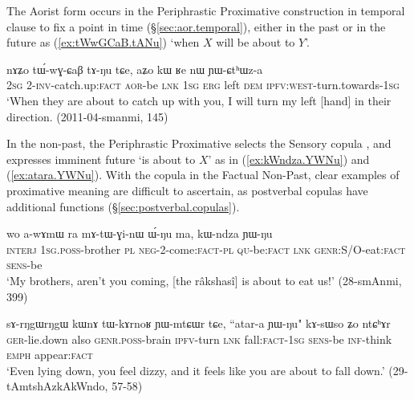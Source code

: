 The Aorist form  occurs in the Periphrastic Proximative construction in temporal clause to fix a point in time (§\ref{sec:aor.temporal}), either in the past or in the future as (\ref{ex:tWwGCaB.tANu}) `when $X$ will be about to $Y$'.

\begin{exe} 
\ex \label{ex:tWwGCaB.tANu}
\gll  nɤʑo tɯ́-wɣ-ɕaβ tɤ-ŋu tɕe, aʑo kɯ ʁe nɯ ɲɯ-ɕtʰɯz-a \\
\textsc{2sg} 2-\textsc{inv}-catch.up:\textsc{fact} \textsc{aor}-be \textsc{lnk} \textsc{1sg} \textsc{erg} left \textsc{dem} \textsc{ipfv}:\textsc{west}-turn.towards-\textsc{1sg} \\ 
\glt `When they are about to catch up with you, I will turn my left [hand] in their direction. (2011-04-smanmi, 145)
 \end{exe}
 
In the non-past, the Periphrastic Proximative selects the Sensory copula , and expresses imminent future `is about to $X$' as in (\ref{ex:kWndza.YWNu}) and (\ref{ex:atara.YWNu}). With the copula in the Factual Non-Past, clear examples of proximative meaning are difficult to ascertain, as postverbal copulas have additional functions (§\ref{sec:postverbal.copulas}).

 \begin{exe} 
\ex \label{ex:kWndza.YWNu}
\gll  wo a-wɤmɯ ra mɤ-tɯ-ɣi-nɯ ɯ́-ŋu ma, kɯ-ndza ɲɯ-ŋu \\
\textsc{interj} \textsc{1sg}.\textsc{poss}-brother \textsc{pl} \textsc{neg}-2-come:\textsc{fact}-\textsc{pl} \textsc{qu}-be:\textsc{fact} \textsc{lnk} \textsc{genr}:S/O-eat:\textsc{fact} \textsc{sens}-be \\
\glt `My brothers, aren't you coming, [the râkshasî] is about to eat us!' (28-smAnmi, 399)
 \end{exe}

 \begin{exe} 
\ex \label{ex:atara.YWNu}
\gll sɤ-rŋgɯ\redp{}rŋgɯ kɯnɤ tɯ-kɤrnoʁ ɲɯ-mtɕɯr tɕe, ``atar-a ɲɯ-ŋu" kɤ-sɯso ʑo ntɕʰɤr \\
\textsc{ger}-lie.down also \textsc{genr}.\textsc{poss}-brain \textsc{ipfv}-turn \textsc{lnk} fall:\textsc{fact}-\textsc{1sg} \textsc{sens}-be \textsc{inf}-think \textsc{emph} appear:\textsc{fact} \\
\glt `Even lying down, you feel dizzy, and it feels like you are about to fall down.' (29-tAmtshAzkAkWndo, 57-58)
 \end{exe}
 

